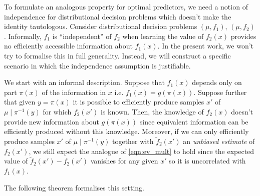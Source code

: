 \documentclass{article}
\numberwithin{equation}{section}
\theoremstyle{definition}
\theoremstyle{plain}
\begin{document}
To formulate an analogous property for optimal predictors, we need a notion of independence for distributional decision problems which doesn't make the identity tautologous. Consider distributional decision problems $(\mu, f_1)$, $(\mu, f_2)$. Informally, $f_1$ is \enquote{independent} of $f_2$ when learning the value of $f_2(x)$ provides no efficiently accessible information about $f_1(x)$. In the present work, we won't try to formalise this in full generality. Instead, we will construct a specific scenario in which the independence assumption is justifiable.

We start with an informal description. Suppose that $f_1(x)$ depends only on part $\pi(x)$ of the information in $x$ i.e. $f_1(x) = g(\pi(x))$. Suppose further that given $y=\pi(x)$ it is possible to efficiently produce samples $x'$ of $\mu \mid \pi^{-1}(y)$ for which $f_2(x')$ is known. Then, the knowledge of $f_2(x)$ doesn't provide new information about $g(\pi(x))$ since equivalent information can be efficiently produced without this knowledge.
 Moreover, if we can only efficiently produce samples $x'$ of $\mu \mid \pi^{-1}(y)$ together with $\tilde{f}_2(x')$ an \emph{unbiased estimate} of $f_2(x')$, we still expect the analogue of \ref{eqn:ev_mult} to hold since the expected value of $\tilde{f}_2(x') - f_2(x')$ vanishes for any given $x'$ so it is uncorrelated with $f_1(x)$.
 
The following theorem formalises this setting.
\end{document}
